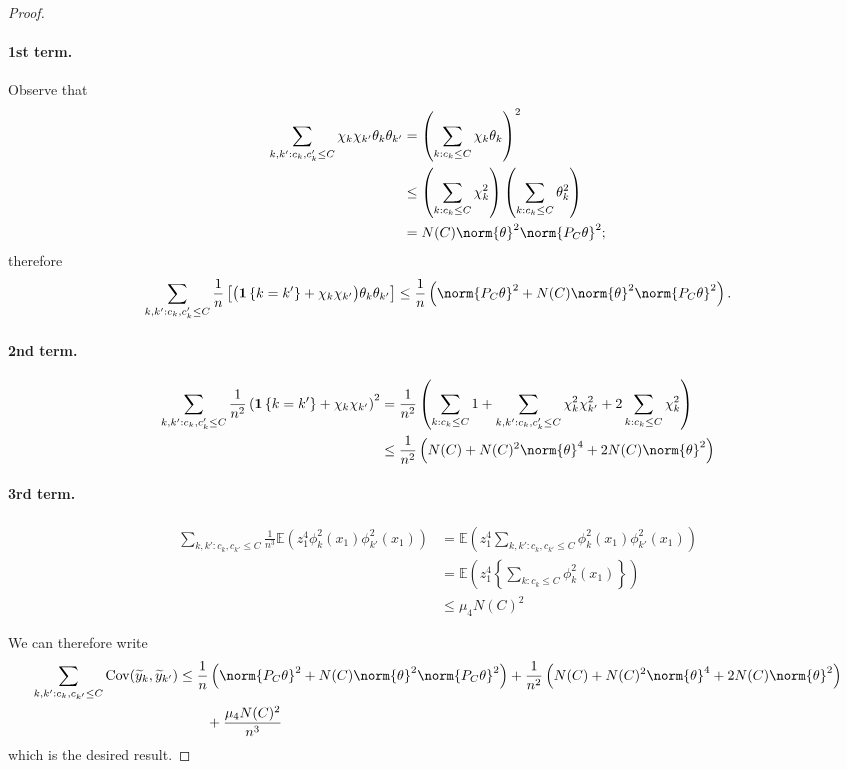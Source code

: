 \documentclass{article}
\newcommand{\set}[1]{\left\{#1\right\}}
\newcommand{\Cov}{\mathrm{Cov}}
\newcommand{\1}{\mathbb{I}}
\newcommand{\Ebb}{\mathbb{E}}
\theoremstyle{alden}
\theoremstyle{aldenthm}
\theoremstyle{definition}
\theoremstyle{remark}
\begin{document}
\begin{proof}
	\paragraph{1st term.}
	Observe that
	\begin{align*}
	\sum_{k,k': c_k,c_k' \leq C} \chi_k \chi_{k'} \theta_k \theta_{k'} & =  \left(\sum_{k:c_k \leq C} \chi_k \theta_k\right)^2 \\
	& \leq \left(\sum_{k: c_k \leq C} \chi_k^2\right) \left(\sum_{k:c_k \leq C} \theta_k^2\right) \\
	& = N(C) \norm{\theta}^2 \norm{P_C \theta}^2;
	\end{align*}
	therefore
	\begin{equation*}
	\sum_{k,k': c_k,c_k' \leq C} \frac{1}{n} \left[\bigl(\mathbf{1}\set{k = k'} + \chi_k \chi_{k'}\bigr)\theta_k\theta_{k'}\right] \leq \frac{1}{n} \left(\norm{P_C\theta}^2 + N(C) \norm{\theta}^2 \norm{P_C\theta}^2\right).
	\end{equation*}
	
	\paragraph{2nd term.}
	\begin{align*}
	\sum_{k,k': c_k,c_k' \leq C} \frac{1}{n^2} \left(\mathbf{1}\set{k = k'} + \chi_k \chi_{k'}\right)^2 & = \frac{1}{n^2} \left(\sum_{k:c_k \leq C} 1 + \sum_{k,k': c_k,c_k' \leq C} \chi_k^2 \chi_{k'}^2 + 2 \sum_{k:c_k \leq C} \chi_k^2\right) \\
	& \leq  \frac{1}{n^2} \left(N(C) + N(C)^2 \norm{\theta}^4 + 2 N(C) \norm{\theta}^2\right)
	\end{align*}
	
	\paragraph{3rd term.}
	\begin{align*}
	\sum_{k,k': c_k, c_{k'} \leq C} \frac{1}{n^3}\Ebb(z_1^4 \phi_k^2(x_1) \phi_{k'}^2(x_1)) & = \Ebb \left(z_1^4 \sum_{k,k': c_k, c_{k'} \leq C} \phi_k^2(x_1) \phi_{k'}^2(x_1) \right)  \\
	& = \Ebb \left(z_1^4 \left\{ \sum_{k:c_k \leq C}\phi_k^2(x_1) \right\} \right) \\
	& \leq \mu_4 N(C)^2
	\end{align*}
	
	We can therefore write
	\begin{align*}
	\sum_{k,k': c_k, c_{k'} \leq C} \Cov(\widetilde{y}_k, \widetilde{y}_{k'}) & \leq \frac{1}{n} \left(\norm{P_C\theta}^2 + N(C) \norm{\theta}^2 \norm{P_C\theta}^2\right) + \frac{1}{n^2}\left(N(C) + N(C)^2 \norm{\theta}^4 + 2N(C)\norm{\theta}^2\right) \\
	& \quad \quad + \frac{\mu_4 N(C)^2}{n^3}
	\end{align*}
	which is the desired result.
\end{proof}
\end{document}
